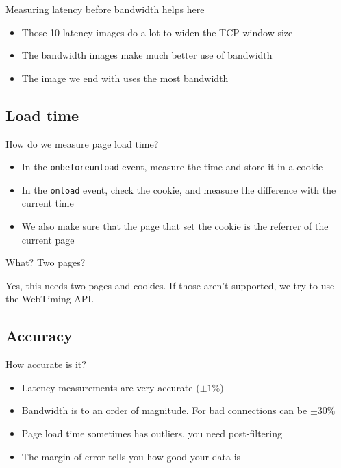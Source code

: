 \documentclass{beamer}
\begin{document}
\begin{frame}{Measuring latency before bandwidth helps here}
  \begin{itemize}
  \item Those 10 latency images do a lot to widen the TCP window size
  \item The bandwidth images make much better use of bandwidth
  \item The image we end with uses the most bandwidth
  \end{itemize}
\end{frame}

\subsection{Load time}
\begin{frame}{How do we measure page load time?}
  \begin{itemize}
  \item In the \texttt{onbeforeunload} event, measure the time and store it in a cookie
  \item In the \texttt{onload} event, check the cookie, and measure the difference with the current time
  \item We also make sure that the page that set the cookie is the referrer of the current page
  \end{itemize}
\end{frame}

\begin{frame}{What? Two pages?}
  \begin{center}
  Yes, this needs two pages and cookies.  If those aren't supported, we try to use the WebTiming API.
  \end{center}
\end{frame}

\subsection{Accuracy}
\begin{frame}{How accurate is it?}
  \begin{itemize}
  \item Latency measurements are very accurate (\(\pm 1\%\))
  \item Bandwidth is to an order of magnitude. For bad connections can be \(\pm 30\%\)
  \item Page load time sometimes has outliers, you need post-filtering
  \item The margin of error tells you how good your data is
  \end{itemize}
\end{frame}
\end{document}
